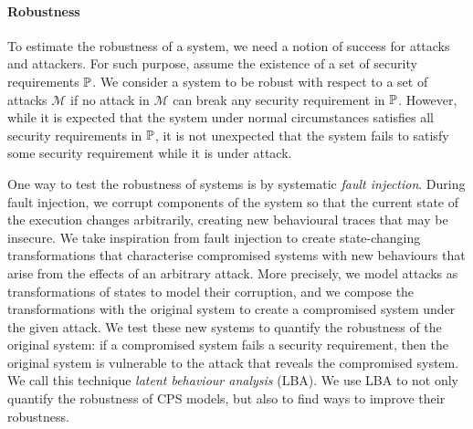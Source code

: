 \paragraph{Robustness}
{\color{blue}
To estimate the robustness of a system, we need a notion of success for attacks and attackers. For such purpose, assume the existence of a set of security requirements $\mathbb{P}$. 
We consider a system to be robust with respect to a set of attacks $\mathcal{M}$ if no attack in $\mathcal{M}$ can break any security requirement in $\mathbb{P}$. 
However, while it is expected that the system under normal circumstances satisfies all security requirements in $\mathbb{P}$, it is not unexpected that the system fails to satisfy some security requirement while it is under attack. 
}

One way to test the robustness of systems is by systematic \emph{fault injection}. 
During fault injection, we corrupt components of the system so that the current state of the execution changes arbitrarily, creating new behavioural traces that may be insecure. We take inspiration from fault injection to create state-changing transformations that characterise compromised systems with new behaviours that arise from the effects of an arbitrary attack. More precisely, we model attacks as transformations of states to model their corruption, and we compose the transformations with the original system to create a compromised system under the given attack. We test these new systems to quantify the robustness of the original system: if a compromised system fails a security requirement, then the original system is vulnerable to the attack that reveals the compromised system. We call this technique \emph{latent behaviour analysis} (LBA). We use LBA to not only quantify the robustness of CPS models, but also to find ways to improve their robustness.
 
